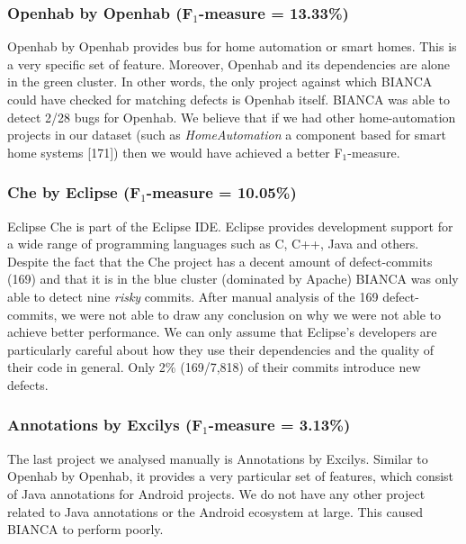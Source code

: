 \documentclass[12pt]{report}
\begin{document}
\subsubsection{\texorpdfstring{Openhab by Openhab (F\(_1\)-measure =
13.33\%)}{Openhab by Openhab (F\_1-measure = 13.33\%)}}\label{openhab-by-openhab-fux5f1-measure-13.33}

Openhab by Openhab provides bus for home automation or smart homes. This
is a very specific set of feature. Moreover, Openhab and its
dependencies are alone in the green cluster. In other words, the only
project against which BIANCA could have checked for matching defects is
Openhab itself. BIANCA was able to detect 2/28 bugs for Openhab. We
believe that if we had other home-automation projects in our dataset
(such as \emph{HomeAutomation} a component based for smart home systems
{[}171{]}) then we would have achieved a better F\(_1\)-measure.

\subsubsection{\texorpdfstring{Che by Eclipse (F\(_1\)-measure =
10.05\%)}{Che by Eclipse (F\_1-measure = 10.05\%)}}\label{che-by-eclipse-fux5f1-measure-10.05}

Eclipse Che is part of the Eclipse IDE. Eclipse provides development
support for a wide range of programming languages such as C, C++, Java
and others. Despite the fact that the Che project has a decent amount of
defect-commits (169) and that it is in the blue cluster (dominated by
Apache) BIANCA was only able to detect nine \emph{risky} commits. After
manual analysis of the 169 defect-commits, we were not able to draw any
conclusion on why we were not able to achieve better performance. We can
only assume that Eclipse's developers are particularly careful about how
they use their dependencies and the quality of their code in general.
Only 2\% (169/7,818) of their commits introduce new defects.

\subsubsection{\texorpdfstring{Annotations by Excilys (F\(_1\)-measure =
3.13\%)}{Annotations by Excilys (F\_1-measure = 3.13\%)}}\label{annotations-by-excilys-fux5f1-measure-3.13}

The last project we analysed manually is Annotations by Excilys. Similar
to Openhab by Openhab, it provides a very particular set of features,
which consist of Java annotations for Android projects. We do not have
any other project related to Java annotations or the Android ecosystem
at large. This caused BIANCA to perform poorly.
\end{document}
